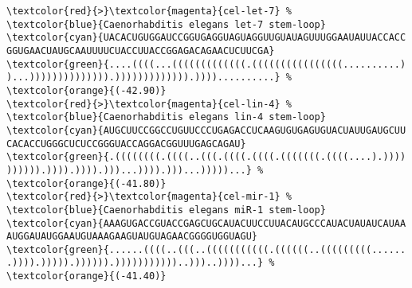 \begin{Verbatim}[frame=single,commentchar=\%,fontsize=\relscale{0.76}]
\textcolor{red}{>}\textcolor{magenta}{cel-let-7} %
\textcolor{blue}{Caenorhabditis elegans let-7 stem-loop}
\textcolor{cyan}{UACACUGUGGAUCCGGUGAGGUAGUAGGUUGUAUAGUUUGGAAUAUUACCACC
GGUGAACUAUGCAAUUUUCUACCUUACCGGAGACAGAACUCUUCGA}
\textcolor{green}{....((((...(((((((((((((.((((((((((((((((..........)
)...)))))))))))))).))))))))))))).))))..........} %
\textcolor{orange}{(-42.90)}
\textcolor{red}{>}\textcolor{magenta}{cel-lin-4} %
\textcolor{blue}{Caenorhabditis elegans lin-4 stem-loop}
\textcolor{cyan}{AUGCUUCCGGCCUGUUCCCUGAGACCUCAAGUGUGAGUGUACUAUUGAUGCUU
CACACCUGGGCUCUCCGGGUACCAGGACGGUUUGAGCAGAU}
\textcolor{green}{.((((((((.((((..(((.((((.((((.(((((((.((((....).))))
)))))).)))).)))).)))...)))).)))...)))))...} %
\textcolor{orange}{(-41.80)}
\textcolor{red}{>}\textcolor{magenta}{cel-mir-1} %
\textcolor{blue}{Caenorhabditis elegans miR-1 stem-loop}
\textcolor{cyan}{AAAGUGACCGUACCGAGCUGCAUACUUCCUUACAUGCCCAUACUAUAUCAUAA
AUGGAUAUGGAAUGUAAAGAAGUAUGUAGAACGGGGUGGUAGU}
\textcolor{green}{......((((..(((..(((((((((((.((((((..(((((((((......
.)))).))))).)))))).)))))))))))..)))..))))...} %
\textcolor{orange}{(-41.40)}
\end{Verbatim}
